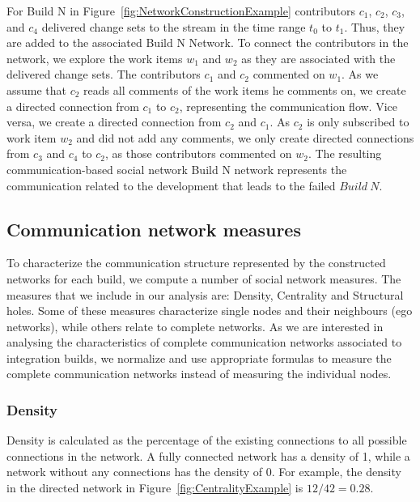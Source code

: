 For Build N in Figure~\ref{fig:NetworkConstructionExample} contributors $c_1$,
$c_2$, $c_3$, and $c_4$ delivered change sets to the stream in the time range $t_0$
to $t_1$. Thus, they are added to the associated Build N Network. To connect the
contributors in the network, we explore the work items $w_1$ and $w_2$ as they
are associated with the delivered change sets. The contributors $c_1$ and $c_2$
commented on $w_1$. As we assume that $c_2$ reads all comments of the work items
he comments on, we create a directed connection from $c_1$ to $c_2$, representing
the communication flow. Vice versa, we create a directed connection from $c_2$
and $c_1$. As $c_2$ is only subscribed to work item $w_2$ and did not add any
comments, we only create directed connections from $c_3$ and $c_4$ to $c_2$, as
those contributors commented on $w_2$. The resulting communication-based social
network Build N network represents the communication related to the development
that leads to the failed $Build~N$.

\subsection{Communication network measures}
To characterize the communication structure represented by the constructed
networks for each build, we compute a number of social network measures. The
measures that we include in our analysis are: Density, Centrality and Structural
holes. Some of these measures characterize single nodes and their neighbours (ego
networks), while others relate to complete networks. As we are interested in
analysing the characteristics of complete communication networks associated to
integration builds, we normalize and use appropriate formulas to measure the
complete communication networks instead of measuring the individual nodes.


\subsubsection{Density}
Density is calculated as the percentage of the existing connections to all
possible connections in the network. A fully connected network has a density of
1, while a network without any connections has the density of 0. For example, the
density in the directed network in Figure~\ref{fig:CentralityExample} is
$12/42=0.28$.

